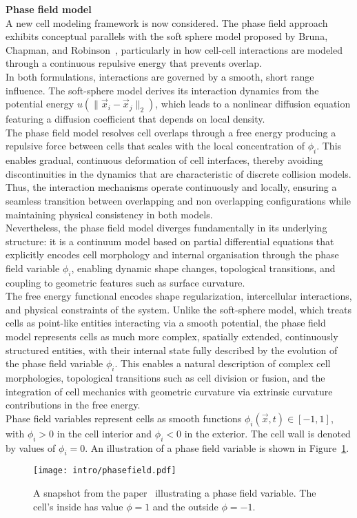 \textbf{Phase field model} \\
A new cell modeling framework is now considered. 
The phase field approach exhibits conceptual parallels with the soft sphere model proposed by Bruna, Chapman, and Robinson~\cite{Bruna2017}, particularly in how cell-cell interactions are modeled through a continuous repulsive energy that prevents overlap. \\
In both formulations, interactions are governed by a smooth, short range influence. 
The soft-sphere model derives its interaction dynamics from the potential energy $u(\|\vec{x}_i - \vec{x}_j\|_2)$, which leads to a nonlinear diffusion equation featuring a diffusion coefficient that depends on local density. \\
The phase field model resolves cell overlaps through a free energy producing a repulsive force between cells that scales with the local concentration of $\phi_i$. 
This enables gradual, continuous deformation of cell interfaces, thereby avoiding discontinuities in the dynamics that are characteristic of discrete collision models. 
Thus, the interaction mechanisms operate continuously and locally, ensuring a seamless transition between overlapping and non overlapping configurations while maintaining physical consistency in both models. \\
Nevertheless, the phase field model diverges fundamentally in its underlying structure: it is a continuum model based on partial differential equations that explicitly encodes cell morphology and internal organisation through the phase field variable $\phi_i$, enabling dynamic shape changes, topological transitions, and coupling to geometric features such as surface curvature. \\
The free energy functional encodes shape regularization, intercellular interactions, and physical constraints of the system. 
Unlike the soft-sphere model, which treats cells as point-like entities interacting via a smooth potential, the phase field model represents cells as much more complex, spatially extended, continuously structured entities, with their internal state fully described by the evolution of the phase field variable $\phi_i$. 
This enables a natural description of complex cell morphologies, topological transitions such as cell division or fusion, and the integration of cell mechanics with geometric curvature via extrinsic curvature contributions in the free energy. \\
Phase field variables represent cells as smooth functions $\phi_i(\vec{x}, t) \in [-1, 1]$, with $\phi_i > 0$ in the cell interior and $\phi_i <0$ in the exterior. 
The cell wall is denoted by values of $\phi_i = 0$. 
An illustration of a phase field variable is shown in Figure~\ref{fig:phasefield}. \\
\begin{figure}[h!]
	\centering
	\texttt{[image: intro/phasefield.pdf]}
	\caption{A snapshot from the paper~\cite{alert2020} illustrating a phase field variable. 
	The cell's inside has value $\phi = 1$ and the outside $\phi = -1$. 
	}
	\label{fig:phasefield}
\end{figure}

